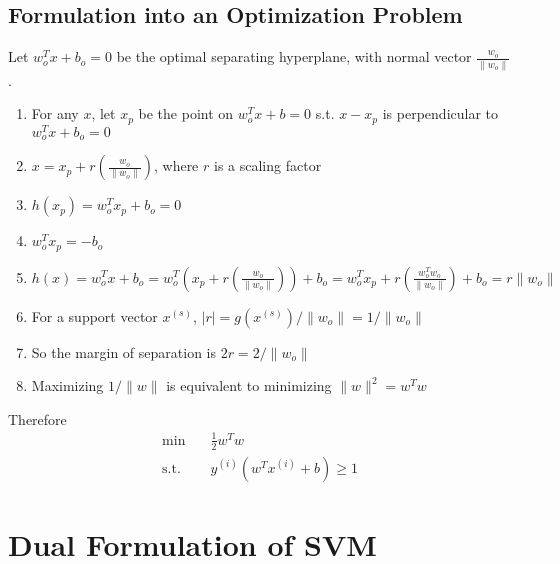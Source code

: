     \subsection{Formulation into an Optimization Problem}
        Let $w_o^Tx+b_o=0$ be the optimal separating hyperplane, with normal vector $\frac{w_o}{\|w_o\|}$.
        \begin{enumerate}
            \item For any $x$, let $x_p$ be the point on $w_o^Tx+b=0$ s.t. $x - x_p$ is perpendicular to $w_o^Tx+b_o=0$
            \item $x = x_p + r\left(\frac{w_o}{\|w_o\|}\right)$, where $r$ is a scaling factor
            \item $h(x_p) = w_o^Tx_p + b_o = 0$
            \item $w_o^Tx_p = -b_o$
            \item $h(x) = w_o^Tx + b_o = w_o^T\left(x_p + r\left(\frac{w_o}{\|w_o\|}\right)\right) + b_o = w_o^Tx_p + r\left(\frac{w_o^Tw_o}{\|w_o\|}\right) + b_o = r\|w_o\|$
            \item For a support vector $x^{(s)}$, $|r| = g(x^{(s)})/\|w_o\| = 1/\|w_o\|$
            \item So the margin of separation is $2r = 2/\|w_o\|$
            \item Maximizing $1/\|w\|$ is equivalent to minimizing $\|w\|^2 = w^Tw$
        \end{enumerate}
        Therefore
        \begin{align*}
            \min \quad &\frac{1}{2}w^Tw\\
            \text{s.t.} \quad & y^{(i)}(w^Tx^{(i)}+b) \ge 1
        \end{align*}


\section{Dual Formulation of SVM}
